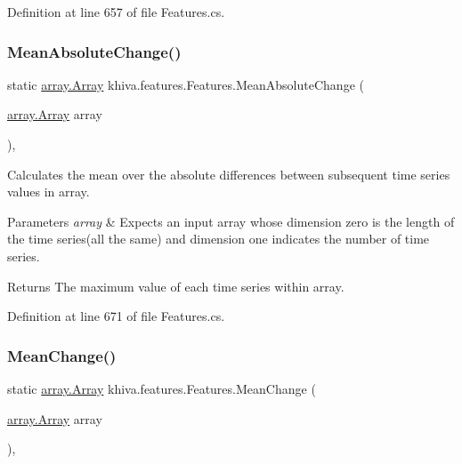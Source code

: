 Definition at line 657 of file Features.\+cs.

\mbox{\label{classkhiva_1_1features_1_1_features_a04d4e4db46271eef51144eae76b00531}} 
\subsubsection{\texorpdfstring{Mean\+Absolute\+Change()}{MeanAbsoluteChange()}}
{\footnotesize\ttfamily static \mbox{\hyperlink{classkhiva_1_1array_1_1_array}{array.\+Array}} khiva.\+features.\+Features.\+Mean\+Absolute\+Change (\begin{DoxyParamCaption}\item[{\mbox{\hyperlink{classkhiva_1_1array_1_1_array}{array.\+Array}}}]{array }\end{DoxyParamCaption})\hspace{0.3cm}{\ttfamily [inline]}, {\ttfamily [static]}}



Calculates the mean over the absolute differences between subsequent time series values in array. 


\begin{DoxyParams}{Parameters}
{\em array} & Expects an input array whose dimension zero is the length of the time series(all the same) and dimension one indicates the number of time series.\\
\hline
\end{DoxyParams}
\begin{DoxyReturn}{Returns}
The maximum value of each time series within array.
\end{DoxyReturn}


Definition at line 671 of file Features.\+cs.

\mbox{\label{classkhiva_1_1features_1_1_features_a50341ca54e63df0a57db6383be276920}} 
\subsubsection{\texorpdfstring{Mean\+Change()}{MeanChange()}}
{\footnotesize\ttfamily static \mbox{\hyperlink{classkhiva_1_1array_1_1_array}{array.\+Array}} khiva.\+features.\+Features.\+Mean\+Change (\begin{DoxyParamCaption}\item[{\mbox{\hyperlink{classkhiva_1_1array_1_1_array}{array.\+Array}}}]{array }\end{DoxyParamCaption})\hspace{0.3cm}{\ttfamily [inline]}, {\ttfamily [static]}}




